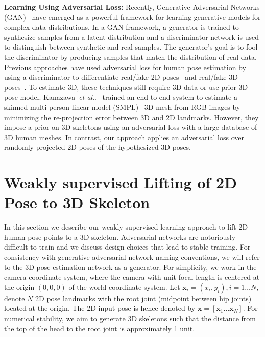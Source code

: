 \documentclass[runningheads]{llncs}
\makeatletter
\DeclareRobustCommand\onedot{\futurelet\@let@token\@onedot}
\def\@onedot{\ifx\@let@token.\else.\null\fi\xspace}
\def\etal{\emph{et al}\onedot}
\makeatother
\begin{document}
\textbf{Learning Using Adversarial Loss:} Recently, Generative Adversarial Networks (GAN)~\cite{GAN} have emerged as a powerful framework for learning generative models for complex data distributions. In a GAN framework, a generator is trained to synthesize samples from a latent distribution and a discriminator network is used to distinguish between synthetic and real samples. The generator's goal is to fool the discriminator by producing samples that {match the distribution of real data}. Previous approaches have used adversarial loss for human pose estimation by using a discriminator to differentiate real/fake 2D poses~\cite{Chen_2017_ICCV} and real/fake 3D poses~\cite{Tung_2017_ICCV,Black2018}. To estimate 3D, these techniques still require 3D data or use prior 3D pose model. Kanazawa~\etal~\cite{Black2018} trained an end-to-end system to estimate a skinned multi-person linear model (SMPL)~\cite{loper2015smpl} 3D mesh from RGB images by minimizing the re-projection error between 3D and 2D landmarks. However, they impose a prior on 3D skeletons using an adversarial loss with a large database of 3D human meshes. In contrast, our approach applies an adversarial loss over randomly projected 2D poses of the hypothesized 3D poses.



\section{Weakly supervised Lifting of 2D Pose to 3D Skeleton}\label{sect:algo}

In this section we describe our weakly supervised learning approach to lift 2D human pose points to a 3D skeleton. Adversarial networks are notoriously difficult to train and we discuss design choices that lead to stable training. For consistency with generative adversarial network naming conventions, we will refer to the 3D pose estimation network as a generator. For simplicity, we work in the camera coordinate system, where the camera with unit focal length is centered at the origin $(0,0,0)$ of the world coordinate system. Let $\textbf{x}_i = (x_i,y_i), i = 1 \ldots N,$ denote $N$ 2D pose landmarks with the root joint (midpoint between hip joints) located at the origin. The 2D input pose is hence denoted by $\textbf{x} = \left[ \textbf{x}_1 \ldots \textbf{x}_N \right]$.
For numerical stability, we aim to generate 3D skeletons such that the distance from the top of the head to the root joint is approximately 1 unit.
\end{document}
